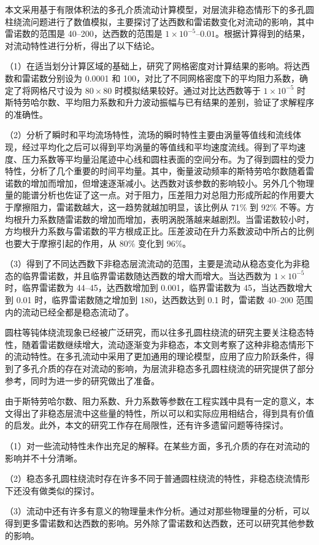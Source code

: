 \begin{conclusions}

本文采用基于有限体积法的多孔介质流动计算模型，对层流非稳态情形下的多孔圆柱绕流问题进行了数值模拟，主要探讨了达西数和雷诺数变化对流动的影响，其中雷诺数的范围是 40--200，达西数的范围是 $1\times 10^{-5}$--$0.01$。根据计算得到的结果，对流动特性进行分析，得出了以下结论。

（1）在适当划分计算区域的基础上，研究了网格密度对计算结果的影响。将达西数和雷诺数分别设为 0.0001 和 100，对比了不同网格密度下的平均阻力系数，确定了将网格尺寸设为 $80\times 80$ 时模拟结果较好。通过对比达西数等于 $1\times 10^{-5}$ 时斯特劳哈尔数、平均阻力系数和升力波动振幅与已有结果的差别，验证了求解程序的准确性。

（2）分析了瞬时和平均流场特性，流场的瞬时特性主要由涡量等值线和流线体现，经过平均化之后可以得到平均涡量的等值线和平均速度流线。得到了平均速度、压力系数等平均量沿尾迹中心线和圆柱表面的空间分布。为了得到圆柱的受力特性，分析了几个重要的时间平均量。其中，衡量波动频率的斯特劳哈尔数随着雷诺数的增加而增加，但增速逐渐减小。达西数对该参数的影响较小。另外几个物理量的能谱分析也佐证了这一点。对于阻力，压差阻力对总阻力形成所起的作用要大于摩擦阻力，雷诺数越大，这一趋势就越加明显，该比例从 71\% 到 92\% 不等。方均根升力系数随雷诺数的增加而增加，表明涡脱落越来越剧烈。当雷诺数较小时，方均根升力系数与雷诺数的平方根成正比。压差波动在升力系数波动中所占的比例也要大于摩擦引起的作用，从 80\% 变化到 96\%。

（3）得到了不同达西数下非稳态层流流动的范围，主要是流动从稳态变化为非稳态的临界雷诺数，并且临界雷诺数随达西数的增大而增大。当达西数为 $1\times 10^{-5}$ 时，临界雷诺数为 44--45，达西数增加到 0.001，临界雷诺数为 45，当达西数增大到 0.01 时，临界雷诺数随之增加到 180，达西数达到 0.1 时，雷诺数 40--200 范围内的流动已经全都是稳态流动了。

圆柱等钝体绕流现象已经被广泛研究，而以往多孔圆柱绕流的研究主要关注稳态特性，随着雷诺数继续增大，流动逐渐变为非稳态，本文则考察了这种非稳态情形下的流动特性。在多孔流动中采用了更加通用的理论模型，应用了应力阶跃条件，得到了多孔介质的存在对流动的影响，为层流非稳态多孔圆柱绕流的研究提供了部分参考，同时为进一步的研究做出了准备。

由于斯特劳哈尔数、阻力系数、升力系数等参数在工程实践中具有一定的意义，本文得出了非稳态层流中这些量的特性，所以可以和实际应用相结合，得到具有价值的启发。此外，本文的研究工作存在局限性，还有许多遗留问题等待探讨。

（1）对一些流动特性未作出充足的解释。在某些方面，多孔介质的存在对流动的影响并不十分清晰。

（2）稳态多孔圆柱绕流时存在许多不同于普通圆柱绕流的特性，非稳态绕流情形下还没有做类似的探讨。

（3）流动中还有许多有意义的物理量未作分析。通过对那些物理量的分析，可以得到更多雷诺数和达西数的影响。另外除了雷诺数和达西数，还可以研究其他参数的影响。

\end{conclusions}
